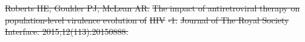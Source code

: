 \documentclass[10pt,letterpaper]{article}
\providecommand{\DIFdeltex}[1]{{\protect\color{red}\sout{#1}}}                      %
\providecommand{\DIFaddbegin}{} %
\providecommand{\DIFaddend}{} %
\providecommand{\DIFdelend}{} %
\providecommand{\DIFdel}[1]{\texorpdfstring{\DIFdeltex{#1}}{}} %
\newcommand{\DIFaddincludegraphics}[2][]{{\color{blue}\fbox{\DIFOincludegraphics[#1]{#2}}}} %
\DeclareRobustCommand{\DIFaddbegin}{\DIFOaddbegin \let\includegraphics\DIFaddincludegraphics} %
\DeclareRobustCommand{\DIFaddend}{\DIFOaddend \let\includegraphics\DIFOincludegraphics} %
\DeclareRobustCommand{\DIFdelend}{\DIFOaddend \let\includegraphics\DIFOincludegraphics} %
\begin{document}
\DIFdel{Roberts HE, Goulder PJ, McLean AR.
}%
\DIFdel{The impact of antiretroviral therapy on population-level virulence
  evolution of }%
\DIFdel{HIV}%
\DIFdel{-1.
}%
\DIFdel{Journal of The Royal Society Interface. 2015;12(113):20150888.
}%

\DIFdelend \DIFaddbegin 
 \DIFaddend
\end{document}
